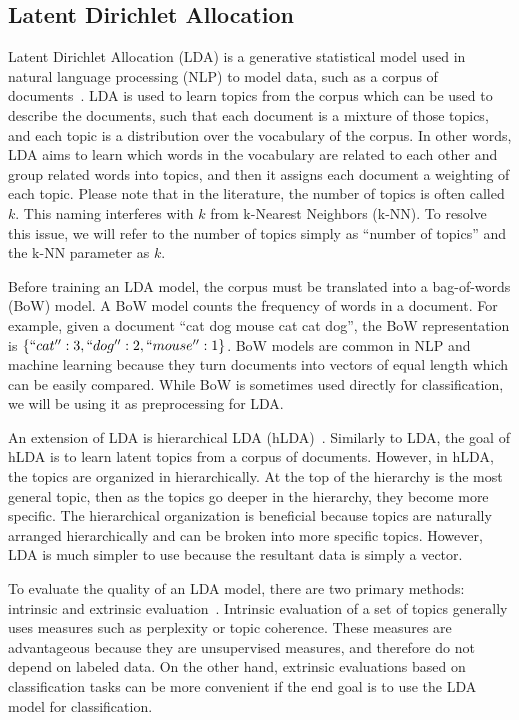 \documentclass[../stegner_thesis.tex]{subfiles}
\begin{document}
\subsection{Latent Dirichlet Allocation}%
\label{subsec:bg_lda}

\par Latent Dirichlet Allocation (LDA) is a generative statistical model used
in natural language processing (NLP) to model data, such as a corpus of
documents~\cite{bleiLatentDirichlet2003}.
LDA is used to learn topics from the corpus which can be used to describe the
documents, such that each document is a mixture of those topics, and each topic
is a distribution over the vocabulary of the corpus.
In other words, LDA aims to learn which words in the vocabulary are related to
each other and group related words into topics, and then it assigns each
document a weighting of each topic.
Please note that in the literature, the number of topics is often called $k$.
This naming interferes with $k$ from k-Nearest Neighbors (k-NN).
To resolve this issue, we will refer to the number of topics simply as ``number
of topics'' and the k-NN parameter as $k$.

\par Before training an LDA model, the corpus must be translated into a
bag-of-words (BoW) model.
A BoW model counts the frequency of words in a document.
For example, given a document ``cat dog mouse cat cat dog'', the BoW
representation is $\{``cat'':3, ``dog'':2, ``mouse'':1\}$.
BoW models are common in NLP and machine learning because they turn documents
into vectors of equal length which can be easily compared.
While BoW is sometimes used directly for classification, we will be using it as
preprocessing for LDA\@.

\par An extension of LDA is hierarchical LDA
(hLDA)~\cite{bleiHierarchicalTopic2004}.
Similarly to LDA, the goal of hLDA is to learn latent topics from a corpus of
documents.
However, in hLDA, the topics are organized in hierarchically.
At the top of the hierarchy is the most general topic, then as the topics go
deeper in the hierarchy, they become more specific.
The hierarchical organization is beneficial because topics are naturally
arranged hierarchically and can be broken into more specific topics.
However, LDA is much simpler to use because the resultant data is simply a
vector.

\par To evaluate the quality of an LDA model, there are two primary methods:
intrinsic and extrinsic evaluation~\cite{dietzTopicModel}.
Intrinsic evaluation of a set of topics generally uses measures such as
perplexity or topic coherence.
These measures are advantageous because they are unsupervised measures, and
therefore do not depend on labeled data.
On the other hand, extrinsic evaluations based on classification tasks can be
more convenient if the end goal is to use the LDA model for classification.
\end{document}
